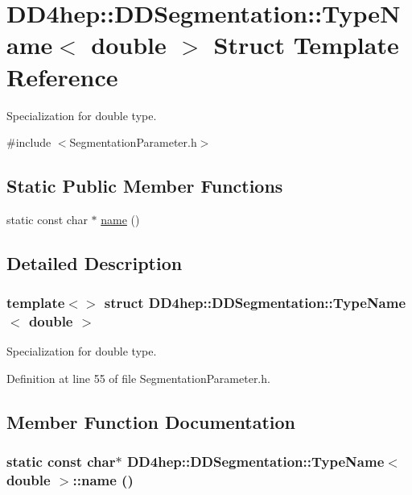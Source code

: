 \hypertarget{struct_d_d4hep_1_1_d_d_segmentation_1_1_type_name_3_01double_01_4}{
\section{DD4hep::DDSegmentation::TypeName$<$ double $>$ Struct Template Reference}
\label{struct_d_d4hep_1_1_d_d_segmentation_1_1_type_name_3_01double_01_4}
}


Specialization for double type.  


{\ttfamily \#include $<$SegmentationParameter.h$>$}\subsection*{Static Public Member Functions}
\begin{DoxyCompactItemize}
\item 
static const char $\ast$ \hyperlink{struct_d_d4hep_1_1_d_d_segmentation_1_1_type_name_3_01double_01_4_a1ee6a72d83bf24e30024e39938747a36}{name} ()
\end{DoxyCompactItemize}


\subsection{Detailed Description}
\subsubsection*{template$<$$>$ struct DD4hep::DDSegmentation::TypeName$<$ double $>$}

Specialization for double type. 

Definition at line 55 of file SegmentationParameter.h.

\subsection{Member Function Documentation}
\hypertarget{struct_d_d4hep_1_1_d_d_segmentation_1_1_type_name_3_01double_01_4_a1ee6a72d83bf24e30024e39938747a36}{
\subsubsection[{name}]{\setlength{\rightskip}{0pt plus 5cm}static const char$\ast$ {\bf DD4hep::DDSegmentation::TypeName}$<$ double $>$::name ()}}
\label{struct_d_d4hep_1_1_d_d_segmentation_1_1_type_name_3_01double_01_4_a1ee6a72d83bf24e30024e39938747a36}


